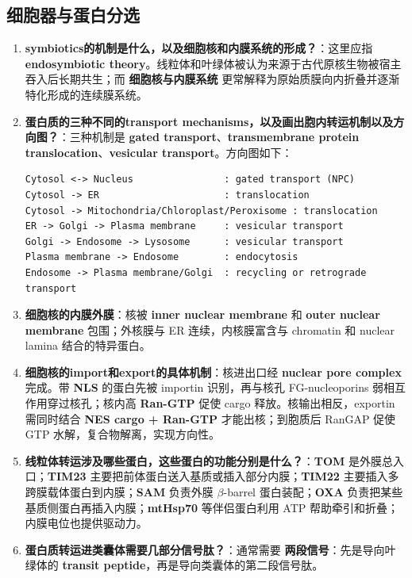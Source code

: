 \documentclass[12pt,fontset=none]{ctexart}
\begin{document}
\subsection*{细胞器与蛋白分选}
\begin{enumerate}
\item \textbf{symbiotics的机制是什么，以及细胞核和内膜系统的形成？}：这里应指 \textbf{endosymbiotic theory}。线粒体和叶绿体被认为来源于古代原核生物被宿主吞入后长期共生；而 \textbf{细胞核与内膜系统} 更常解释为原始质膜向内折叠并逐渐特化形成的连续膜系统。

\item \textbf{蛋白质的三种不同的transport mechanisms，以及画出胞内转运机制以及方向图？}：三种机制是 \textbf{gated transport}、\textbf{transmembrane protein translocation}、\textbf{vesicular transport}。方向图如下：

\begin{verbatim}
Cytosol <-> Nucleus                : gated transport (NPC)
Cytosol -> ER                      : translocation
Cytosol -> Mitochondria/Chloroplast/Peroxisome : translocation
ER -> Golgi -> Plasma membrane     : vesicular transport
Golgi -> Endosome -> Lysosome      : vesicular transport
Plasma membrane -> Endosome        : endocytosis
Endosome -> Plasma membrane/Golgi  : recycling or retrograde transport
\end{verbatim}

\item \textbf{细胞核的内膜外膜}：核被 \textbf{inner nuclear membrane} 和 \textbf{outer nuclear membrane} 包围；外核膜与 ER 连续，内核膜富含与 chromatin 和 nuclear lamina 结合的特异蛋白。

\item \textbf{细胞核的import和export的具体机制}：核进出口经 \textbf{nuclear pore complex} 完成。带 \textbf{NLS} 的蛋白先被 importin 识别，再与核孔 FG-nucleoporins 弱相互作用穿过核孔；核内高 \textbf{Ran-GTP} 促使 cargo 释放。核输出相反，exportin 需同时结合 \textbf{NES cargo + Ran-GTP} 才能出核；到胞质后 RanGAP 促使 GTP 水解，复合物解离，实现方向性。

\item \textbf{线粒体转运涉及哪些蛋白，这些蛋白的功能分别是什么？}：\textbf{TOM} 是外膜总入口；\textbf{TIM23} 主要把前体蛋白送入基质或插入部分内膜；\textbf{TIM22} 主要插入多跨膜载体蛋白到内膜；\textbf{SAM} 负责外膜 $\beta$-barrel 蛋白装配；\textbf{OXA} 负责把某些基质侧蛋白再插入内膜；\textbf{mtHsp70} 等伴侣蛋白利用 ATP 帮助牵引和折叠；内膜电位也提供驱动力。

\item \textbf{蛋白质转运进类囊体需要几部分信号肽？}：通常需要 \textbf{两段信号}：先是导向叶绿体的 \textbf{transit peptide}，再是导向类囊体的第二段信号肽。


\end{enumerate}
\end{document}

